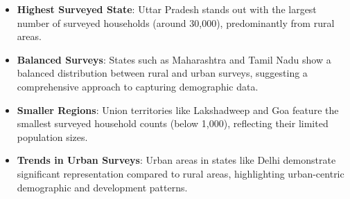 \documentclass{article}
\begin{document}
\begin{itemize}
	\item \textbf{Highest Surveyed State}: Uttar Pradesh stands out with the largest number of surveyed households (around 30,000), predominantly from rural areas.
	\item \textbf{Balanced Surveys}: States such as Maharashtra and Tamil Nadu show a balanced distribution between rural and urban surveys, suggesting a comprehensive approach to capturing demographic data.
	\item \textbf{Smaller Regions}: Union territories like Lakshadweep and Goa feature the smallest surveyed household counts (below 1,000), reflecting their limited population sizes.
	\item \textbf{Trends in Urban Surveys}: Urban areas in states like Delhi demonstrate significant representation compared to rural areas, highlighting urban-centric demographic and development patterns.
\end{itemize}

\newpage
	
\end{document}
